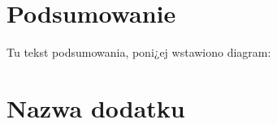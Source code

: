 \documentclass[twoside,openright]{wfaiis}
\begin{document}
\maketitle

\tableofcontents




%

\chapter{Podsumowanie}
Tu tekst podsumowania, poni¿ej wstawiono diagram:

\listoffigures
\listoftables
\listofcharts
\listofdiagrams
\listofcodes

\appendix
\chapter{Nazwa dodatku}

\nocite{*} 

%
\end{document}
